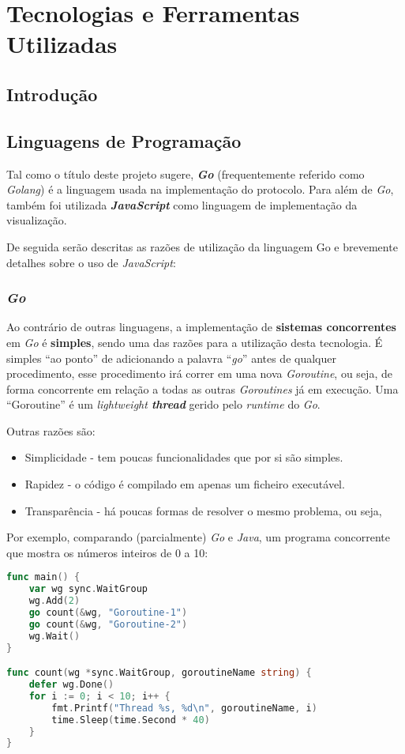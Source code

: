\chapter{Tecnologias e Ferramentas Utilizadas}
\label{chap:tecno-ferra}

\section{Introdução}
\label{chap3:sec:intro}
\section{Linguagens de Programação}
\label{chap3:linguagens}
Tal como o título deste projeto sugere, \textbf{\emph{Go}} (frequentemente referido como \emph{Golang}) é a linguagem usada na implementação do protocolo. Para além de \emph{Go}, também foi utilizada \textbf{\emph{JavaScript}} como linguagem de implementação da visualização.

De seguida serão descritas as razões de utilização da linguagem Go e brevemente detalhes sobre o uso de \emph{JavaScript}:



\subsection{\emph{Go}}

Ao contrário de outras linguagens, a implementação de \textbf{sistemas concorrentes} em \emph{Go} é \textbf{simples}, sendo uma das razões para a utilização desta tecnologia. É simples ``ao ponto'' de adicionando a palavra ``\emph{go}'' antes de qualquer procedimento, esse procedimento irá correr em uma nova \emph{Goroutine}, ou seja, de forma concorrente em relação a todas as outras \emph{Goroutines} já em execução.
Uma ``Goroutine'' é um \emph{lightweight \textbf{thread}} gerido pelo \emph{runtime} do \emph{Go}.


Outras razões são:
\begin{itemize}
    \item Simplicidade - tem poucas funcionalidades que por si são simples.
    \item Rapidez - o código é compilado em apenas um ficheiro executável.
    \item Transparência - há poucas formas de resolver o mesmo problema, ou seja, 
\end{itemize}


Por exemplo, comparando (parcialmente) \emph{Go} e \emph{Java}, um programa concorrente que mostra os números inteiros de 0 a 10:
\begin{lstlisting}[caption={Exemplo em \emph{Go}, usando a \emph{keyword} ``go'' para começar uma \emph{Goroutine}.},language=Go]
func main() {
	var wg sync.WaitGroup
	wg.Add(2)
	go count(&wg, "Goroutine-1")
	go count(&wg, "Goroutine-2")
	wg.Wait()
}

func count(wg *sync.WaitGroup, goroutineName string) {
	defer wg.Done()
	for i := 0; i < 10; i++ {
		fmt.Printf("Thread %s, %d\n", goroutineName, i)
		time.Sleep(time.Second * 40)
	}
}
\end{lstlisting}


